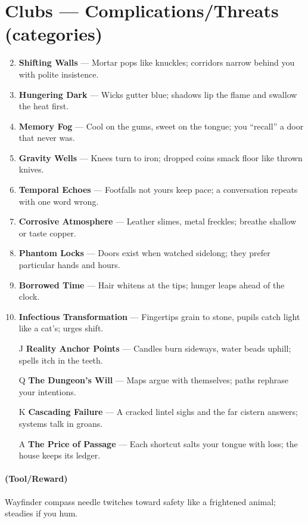 \section*{Clubs --- Complications/Threats (categories)}
\label{sec:dungeon-complications}
\begin{enumerate}
\setcounter{enumi}{1}
\item \textbf{Shifting Walls} --- Mortar pops like knuckles; corridors narrow behind you with polite insistence.
\item \textbf{Hungering Dark} --- Wicks gutter blue; shadows lip the flame and swallow the heat first.
\item \textbf{Memory Fog} --- Cool on the gums, sweet on the tongue; you ``recall'' a door that never was.
\item \textbf{Gravity Wells} --- Knees turn to iron; dropped coins smack floor like thrown knives.
\item \textbf{Temporal Echoes} --- Footfalls not yours keep pace; a conversation repeats with one word wrong.
\item \textbf{Corrosive Atmosphere} --- Leather slimes, metal freckles; breathe shallow or taste copper.
\item \textbf{Phantom Locks} --- Doors exist when watched sidelong; they prefer particular hands and hours.
\item \textbf{Borrowed Time} --- Hair whitens at the tips; hunger leaps ahead of the clock.
\item \textbf{Infectious Transformation} --- Fingertips grain to stone, pupils catch light like a cat's; urges shift.
\item[J] \textbf{Reality Anchor Points} --- Candles burn sideways, water beads uphill; spells itch in the teeth.
\item[Q] \textbf{The Dungeon's Will} --- Maps argue with themselves; paths rephrase your intentions.
\item[K] \textbf{Cascading Failure} --- A cracked lintel sighs and the far cistern answers; systems talk in groans.
\item[A] \textbf{The Price of Passage} --- Each shortcut salts your tongue with loss; the house keeps its ledger.
\end{enumerate}

\paragraph*{(Tool/Reward)} Wayfinder compass needle twitches toward safety like a frightened animal; steadies if you hum.

